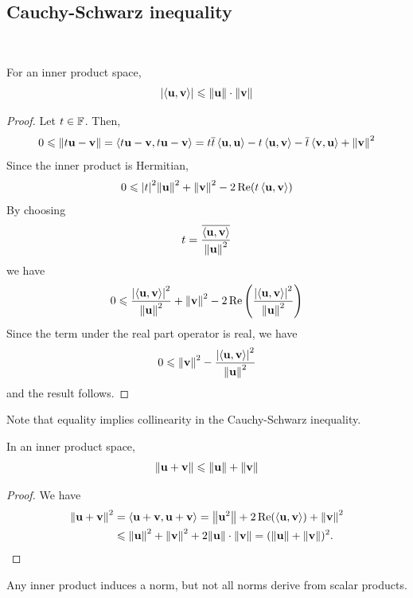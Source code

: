 \documentclass[a4paper,11pt]{article}
\begin{document}
\subsection{Cauchy-Schwarz inequality}
\ \vspace*{-1.5em}
\begin{lemma}
	For an inner product space,
	\[
		\abs{\left\langle{{\bf u},{\bf v}}\right\rangle} \leqslant \norm{\mathbf{u}} \cdot \norm{\mathbf{v}}
	\]
\end{lemma}
\begin{proof}
	Let \( t \in {\mathbb{F}} \).
	Then,
	\[
		0 \leqslant \norm{t {\bf u} - {\bf v}} = \left\langle{t{\bf u}- {\bf v}, t{\bf u}- {\bf v}}\right\rangle = t \overline t \left\langle{{\bf u},{\bf u}}\right\rangle - t \left\langle{{\bf u},{\bf v}}\right\rangle - \overline t \left\langle{{\bf v},{\bf u}}\right\rangle + \norm{{\bf v}}^2
	\]
	Since the inner product is Hermitian,
	\[
		0 \leqslant \abs{t}^2 \norm{{\bf u}}^2 + \norm{{\bf v}}^2 - 2 \Re(t \left\langle{{\bf u},{\bf v}}\right\rangle)
	\]
	By choosing
	\[
		t = \frac{\overline{\left\langle{{\bf u},{\bf v}}\right\rangle}}{\norm{{\bf u}}^2}
	\]
	we have
	\[
		0 \leqslant \frac{\abs{\left\langle{{\bf u},{\bf v}}\right\rangle}^2}{\norm{{\bf u}}^2} + \norm{{\bf v}}^2 - 2 \Re\qty(\frac{\abs{\left\langle{{\bf u},{\bf v}}\right\rangle}^2}{\norm{{\bf u}}^2})
	\]
	Since the term under the real part operator is real, we have 
	\[
		0\leqslant \left\| \mathbf{v} \right\|^2 - \frac{\abs{\left\langle{\mathbf{u},\mathbf{v}}\right\rangle}^2}{\left\| \mathbf{u} \right\|^2}
	\]and the result follows.
\end{proof}
\noindent Note that equality implies collinearity in the Cauchy-Schwarz inequality.
\begin{corollary}
	In an inner product space,
	\[
		\norm{{\bf u}+{\bf v}} \leqslant \norm{{\bf u}} + \norm{{\bf v}}
	\]
\end{corollary}
\begin{proof}
	We have
	\begin{align*}
		\norm{{\bf u}+{\bf v}}^2 &= \left\langle{{\bf u}+{\bf v}, {\bf u}+{\bf v}}\right\rangle = \norm{{\bf u}^2} + 2 \Re(\left\langle{{\bf u},{\bf v}}\right\rangle) + \norm{{\bf v}}^2 \\ 
		&\leqslant \norm{{\bf u}}^2 + \norm{{\bf v}}^2 + 2 \norm{{\bf u}} \cdot \norm{{\bf v}} = (\norm{{\bf u}} + \norm{{\bf v}})^2. \qedhere
	\end{align*}
\end{proof}
\begin{remark}
	Any inner product induces a norm, but not all norms derive from scalar products.
\end{remark}
\end{document}
